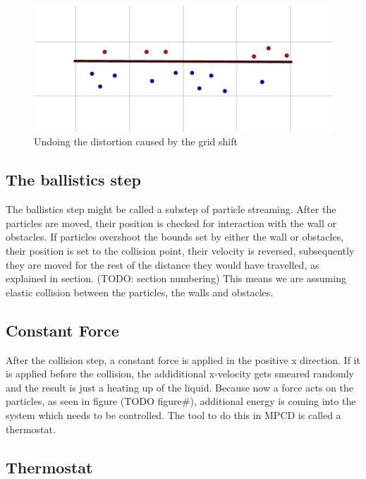 \documentclass[
]{article}
\begin{document}
\begin{figure}
\centering
\includegraphics{Assets/Wall_stick_boundary_conditions_virtual_particles.png}
\caption{Undoing the distortion caused by the grid shift}
\end{figure}

\hypertarget{the-ballistics-step}{%
\subsection{The ballistics step}\label{the-ballistics-step}}

The ballistics step might be called a substep of particle streaming.
After the particles are moved, their position is checked for interaction
with the wall or obstacles. If particles overshoot the bounds set by
either the wall or obstacles, their position is set to the collision
point, their velocity is reversed, subsequently they are moved for the
rest of the distance they would have travelled, as explained in section.
(TODO: section numbering) This means we are assuming elastic collision
between the particles, the walls and obstacles.

\hypertarget{constant-force}{%
\subsection{Constant Force}\label{constant-force}}

After the collision step, a constant force is applied in the positive x
direction. If it is applied before the collision, the addiditional
x-velocity gets smeared randomly and the result is just a heating up of
the liquid. Because now a force acts on the particles, as seen in figure
(TODO figure\#), additional energy is coming into the system which needs
to be controlled. The tool to do this in MPCD is called a thermostat.

\hypertarget{thermostat}{%
\subsection{Thermostat}\label{thermostat}}
\end{document}
